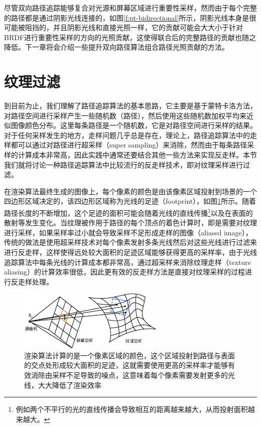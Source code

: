 尽管双向路径追踪能够复合对光源和屏幕区域进行重要性采样，然而由于每个完整的路径都是通过阴影光线连接的，如图\ref{f:pt-bidirectional}所示，阴影光线本身是很可能被阻挡的，并且阴影光线和直接光照一样，它的贡献可能会大大小于针对BRDF进行重要性采样的方向的光照贡献，这使得联合后的完整路径的贡献也随之降低。下一章将会介绍一些提升双向路径算法组合路径光照贡献的方法。







\section{纹理过滤}\label{sec:pt-texture-filtering}
到目前为止，我们理解了路径追踪算法的基本思路，它主要是基于蒙特卡洛方法，对路径空间进行采样产生一些随机数（路径），然后使用这些随机数加权平均来近似图像颜色分布。这里每条路径是一个随机数，它是对路径空间进行采样的结果。对于任何采样发生的地方，走样问题几乎总是存在，理论上，路径追踪算法中的走样都可以通过对路径进行超采样（super sampling）来消除，然而由于每条路径采样的计算成本非常高，因此实践中通常还要结合其他一些方法来实现反走样。本节我们就将讨论一种路径追踪算法中比较流行的反走样技术，即对纹理采样进行过滤。

在渲染算法最终生成的图像上，每个像素的颜色是由该像素区域投射到场景的一个四边形区域决定的，该四边形区域称为光线的足迹（footprint），如图\ref{f:pt-filter-size}所示。随着路径长度的不断增加，这个足迹的面积可能会随着光线的直线传播\footnote{例如两个不平行的光的直线传播会导致相互的距离越来越大，从而投射面积越来越大。}以及在表面的散射等发生变化。当纹理被作用于路径的每个顶点的着色计算时，即是需要对纹理进行采样，如果采样率过小就会导致采样不足形成走样的图像（aliased image），传统的做法是使用超采样技术对每个像素发射多条光线然后对这些光线进行过滤来进行反走样，这样使得远处较大面积的足迹区域能够获得更高的采样率，由于光线追踪算法中每条光线的计算成本都非常高，通过超采样来消除纹理走样（texture aliasing）的计算效率很低，因此更有效的反走样方法是直接对纹理采样的过程进行反走样处理。

\begin{figure}
	\sidecaption
	\includegraphics[width=0.62\textwidth]{figures/pt/filter-size}
	\caption{渲染算法计算的是一个像素区域的颜色，这个区域投射到路径与表面的交点处形成较大面积的足迹，这就需要使用更高的采样率才能够有效消除由采样不足导致的噪点，这意味着每个像素需要发射更多的光线，大大降低了渲染效率}
	\label{f:pt-filter-size}
\end{figure}

